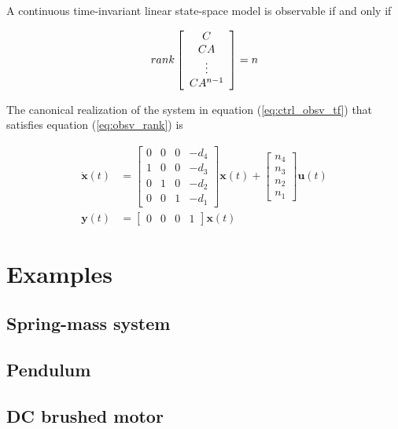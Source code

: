 \documentclass[10pt,conference,compsoc]{IEEEtran}
\newcommand{\mtx}[1] {\bm #1}
\begin{document}
\noindent A continuous time-invariant linear state-space model is observable if
and only if

\begin{equation} \label{eq:obsv_rank}
  rank \left[
  \begin{array}{c}
    C \\
    CA \\
    \vdots \\
    CA^{n-1}
  \end{array}
  \right] = n \\
\end{equation}

\noindent The canonical realization of the system in equation
(\ref{eq:ctrl_obsv_tf}) that satisfies equation (\ref{eq:obsv_rank}) is

\begin{align}
  \dot{\mtx{x}}(t) &= \left[
  \begin{array}{cccc}
    0 & 0 & 0 & -d_4 \\
    1 & 0 & 0 & -d_3 \\
    0 & 1 & 0 & -d_2 \\
    0 & 0 & 1 & -d_1
  \end{array}
  \right] \mtx{x}(t) + \left[
  \begin{array}{c}
    n_4 \\
    n_3 \\
    n_2 \\
    n_1
  \end{array}
  \right] \mtx{u}(t) \\
  \mtx{y}(t) &= \left[
  \begin{array}{cccc}
    0 & 0 & 0 & 1
  \end{array}
  \right] \mtx{x}(t)
\end{align}

\section{Examples}

\subsection{Spring-mass system}

\subsection{Pendulum}

\subsection{DC brushed motor}
\end{document}

